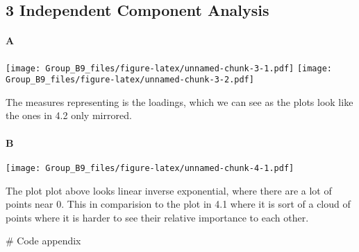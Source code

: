 \documentclass[]{article}
\let\oldparagraph\paragraph
\renewcommand{\paragraph}[1]{\oldparagraph{#1}\mbox{}}
\begin{document}
\subsection{3 Independent Component
Analysis}\label{independent-component-analysis}

\paragraph{A}\label{a}

\texttt{[image: Group\_B9\_files/figure-latex/unnamed-chunk-3-1.pdf]}
\texttt{[image: Group\_B9\_files/figure-latex/unnamed-chunk-3-2.pdf]}

The measures representing is the loadings, which we can see as the plots
look like the ones in 4.2 only mirrored.

\paragraph{B}\label{b}

\texttt{[image: Group\_B9\_files/figure-latex/unnamed-chunk-4-1.pdf]}

The plot plot above looks linear inverse exponential, where there are a
lot of points near 0. This in comparision to the plot in 4.1 where it is
sort of a cloud of points where it is harder to see their relative
importance to each other.

\pagebreak
\# Code appendix
\end{document}
